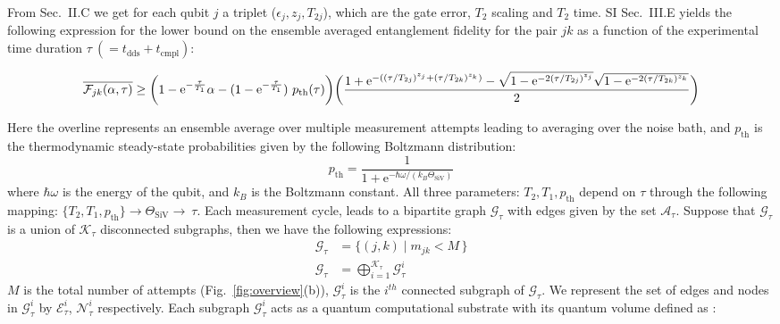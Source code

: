 \documentclass[%
 reprint,
 superscriptaddress,
 amsmath,amssymb,
 aps,
 prx,
]{revtex4-2}
\begin{document}
From Sec.~II.C we get for each qubit $j$ a triplet ($\epsilon_{j},z_{j},T_{2j}$), which are the gate error, $T_2$ scaling and $T_{2}$ time.
SI Sec.~III.E yields the following expression for the lower bound on the ensemble averaged entanglement fidelity for the pair $jk$ as a function of the experimental time duration $\tau~(=t_{\text{dds}}+t_{\text{cmpl}})$\cite{googleSI_Programmable_Quantum_Matter_2025Google}:
\begin{widetext}
\begin{equation}
  \rule{0pt}{3ex} %
  \rule[-1.5ex]{0pt}{0pt} %
  \displaystyle
  \overline{\mathcal{F}_{jk}(\alpha,\tau)} \ge \bigg(1-\text{e}^{-\frac{\tau}{T_{1}}}\alpha - (1- \text{e}^{-\frac{\tau}{T_{ 
 1}}})~p_{\text{th}}(\tau)\bigg)\bigg(\frac{1 +\text{e}^{-((\tau/T_{2j})^{z_{j}}+(\tau/T_{2k})^{z_{k}})} - \sqrt{1 - \text{e}^{-2(\tau/T_{2j})^{z_{j}}}}\sqrt{1 - \text{e}^{-2(\tau/T_{2k})^{z_{k}}}}}{2}\bigg)
\end{equation}
\end{widetext}
Here the overline represents an ensemble average over multiple measurement attempts leading to averaging over the noise bath, 
and $p_{\text{th}}$ is the thermodynamic steady-state probabilities given by the following Boltzmann distribution:
\begin{equation}
    p_{\text{th}} = \frac{1}{1 + \text{e}^{-\hbar\omega / (k_B \Theta_{\text{SiV}})}}
\end{equation}
where $\hbar\omega$ is the energy of the qubit, and $k_{B}$ is the Boltzmann constant. All three parameters: $T_{2}, T_{1}, p_{\text{th}}$ depend on $\tau$ through the following mapping: $\{T_{2}, T_{1}, p_{\text{th}}\}\to\Theta_{\text{SiV}}\to~\tau$. Each measurement cycle, leads to a bipartite graph $\mathcal{G}_{\tau}$ with edges given by the set $\mathcal{A}_{\tau}$. Suppose that $\mathcal{G}_{\tau}$ is a union of $\mathcal{K}_{\tau}$ disconnected subgraphs, then we have the following expressions:
\begin{equation}
\begin{split}
\mathcal{G}_{\tau} &= \{ (j,k) \mid m_{jk} < M \,\}\\
\mathcal{G}_{\tau} &= \bigoplus_{i=1}^{\mathcal{K}_{\tau}} \mathcal{G}^i_{\tau}
\end{split}
\end{equation}
$M$ is the total number of attempts (Fig.~\ref{fig:overview}(b)), $\mathcal{G}^i_{\tau}$ is the $i^{th}$ connected subgraph of $\mathcal{G}_{\tau}$. We represent the set of edges and nodes in $\mathcal{G}^i_{\tau}$ by $\mathcal{E}^i_{\tau}$, $\mathcal{N}^i_{\tau}$ respectively. Each subgraph $\mathcal{G}^i_{\tau}$ acts as a quantum computational substrate with its quantum volume defined as \cite{Cross_2019, Moll2018_QST_VQA}:
\end{document}
